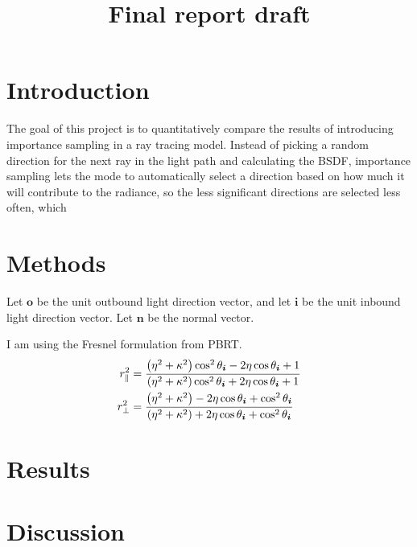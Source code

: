 \documentclass[12pt]{article}
\title{Final report draft}
\begin{document}
\maketitle
\begin{abstract}

\end{abstract}

\section{Introduction}
	The goal of this project is to quantitatively compare the results of introducing importance sampling in a ray tracing model. Instead of picking a random direction for the next ray in the light path and calculating the BSDF, importance sampling lets the mode to automatically select a direction based on how much it will contribute to the radiance, so the less significant directions are selected less often, which 
    
\section{Methods}

Let \(\bm o\) be the unit outbound light direction vector, and let \(\bm i\) be the unit inbound light direction vector.
Let \(\bm n\) be the normal vector.

I am using the Fresnel formulation from PBRT.
\begin{align*}
  r_{\parallel}^2 &= \frac{\del{\eta^2 + \kappa^2}\cos^2 \theta_{\bm i} - 2\eta \cos \theta_{\bm i} + 1}{\del{\eta^2 + \kappa^2}\cos^2 \theta_{\bm i} + 2\eta \cos \theta_{\bm i} + 1}\\
  r_{\perp}^2 &= \frac{\del{\eta^2 + \kappa^2} - 2\eta \cos \theta_{\bm i} + \cos^2 \theta_{\bm i}}{\del{\eta^2 + \kappa^2} + 2\eta \cos \theta_{\bm i} + \cos^2 \theta_{\bm i}}
\end{align*}

\section{Results}

\section{Discussion}
\end{document}
